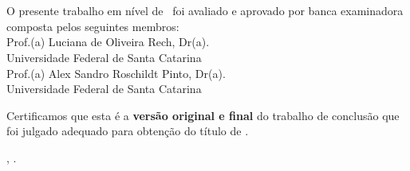 \imprimircapa

\imprimirfolhaderosto*

\begin{fichacatalografica}

\end{fichacatalografica}

\begin{folhadeaprovacao}
\OnehalfSpacing
\centering
\imprimirautor\\%
\vspace*{10pt}		
\textbf{\imprimirtitulo}%
\ifnotempty{\imprimirsubtitulo}{:~\imprimirsubtitulo}\\%
\vspace*{\baselineskip}
O presente trabalho em nível de \imprimirnivel~foi avaliado e aprovado por banca examinadora composta pelos seguintes membros:\\
\vspace*{\baselineskip}
Prof.(a) Luciana de Oliveira Rech, Dr(a).\\
Universidade Federal de Santa Catarina\\
\vspace*{\baselineskip}
Prof.(a) Alex Sandro Roschildt Pinto, Dr(a).\\
Universidade Federal de Santa Catarina\\
\vspace*{\baselineskip}
\vspace*{2\baselineskip}
\begin{minipage}{\textwidth}

Certificamos que esta é a \textbf{versão original e final}
do trabalho de conclusão que foi julgado adequado para obtenção do título de \imprimirformacao.\\
\end{minipage}
\vspace*{\fill}
\vspace*{\fill}
\assinatura{\OnehalfSpacing\imprimirorientador \\ \imprimirorientadorRotulo}
\vspace*{\fill}
\imprimirlocal, \imprimirano.
\end{folhadeaprovacao}

